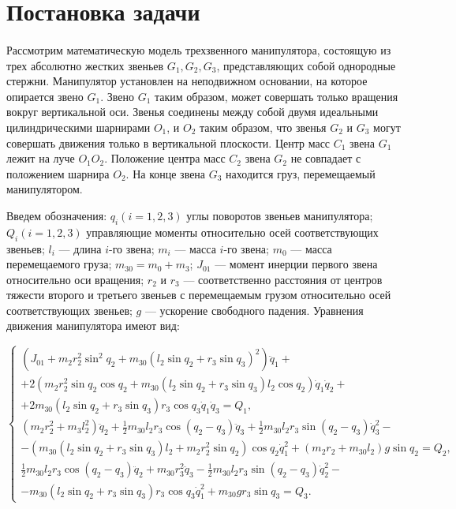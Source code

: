 \section{Постановка задачи} \label{p31}
\paragraph{}
 Рассмотрим математическую модель трехзвенного манипулятора, состоящую из трех абсолютно жестких звеньев $G_1, G_2, G_3$, представляющих собой однородные стержни. Манипулятор установлен на неподвижном основании, на которое опирается звено $G_1$. Звено $G_1$ таким образом, может совершать только вращения вокруг вертикальной оси. Звенья соединены между собой двумя идеальными цилиндрическими шарнирами $O_1$, и $O_2$ таким образом, что звенья $G_2$ и $G_3$ могут совершать движения только в вертикальной плоскости. Центр масс $C_1$ звена $G_1$ лежит на луче  $O_1 O_2$. Положение центра масс $C_2$ звена $G_2$ не совпадает с положением шарнира $O_2$. На конце звена $G_3$ находится груз, перемещаемый манипулятором.
 
 Введем обозначения: $q_i (i=1, 2, 3)$ \textemdash углы поворотов звеньев манипулятора; $Q_i (i = 1, 2, 3)$ \textemdash  управляющие моменты относительно осей соответствующих звеньев; $l_i$  ---  длина   $i$-го звена;   $m_i$ --- масса  $i$-го звена;    $m_0$ ---  масса перемещаемого груза;  $m_{30} = m_0 + m_3$; $J_{01}$  ---  момент инерции первого звена относительно оси вращения; $r_2$ и $r_3$ --- соответственно расстояния от центров тяжести второго и третьего звеньев с перемещаемым грузом относительно осей соответствующих звеньев; $g$ --- ускорение свободного падения.
 Уравнения движения манипулятора имеют вид:
 
 \begin{equation}
 \begin{cases}
 (J_{01} + m_2 r_2^2 \sin^2 q_2 + m_{30} (l_2 \sin q_2 + r_3 \sin q_3)^2) \ddot q_1 + \\ + 2 (m_2 r_2^2 \sin q_2 \cos q_2 + m_{30} (l_2 \sin q_2 + r_3 \sin q_3) l_2 \cos q_2) \dot q_1 \dot q_2 + \\ + 2 m_{30} (l_2 \sin q_2 + r_3 \sin q_3) r_3 \cos q_3 \dot q_1 \dot q_3 = Q_1,
 \\
 (m_2 r_2^2 + m_3 l_2^2) \ddot q_2 + \frac12 m_{30} l_2 r_3 \cos(q_2 - q_3) \ddot q_3 + \frac12 m_{30} l_2 r_3 \sin (q_2 - q_3) \dot q_3^2 - \\ - (m_{30} (l_2 \sin q_2 + r_3 \sin q_3) l_2 + m_2 r_2^2 \sin q_2) \cos q_2 \dot q_1^2 + (m_2 r_2 + m_{30} l_2) g \sin q_2 = Q_2,
 \\
 \frac12 m_{30} l_2 r_3 \cos(q_2 - q_3) \ddot q_2 + m_{30} r_3^2 \ddot q_3 - \frac12 m_{30} l_2 r_3 \sin (q_2 - q_3) \dot q_2^2 - \\ - m_{30} (l_2 \sin q_2 + r_3 \sin q_3) r_3 \cos q_3 \dot q_1^2 + m_{30} g r_3 \sin q_3 = Q_3.
 \end{cases}
 \end{equation}
 
